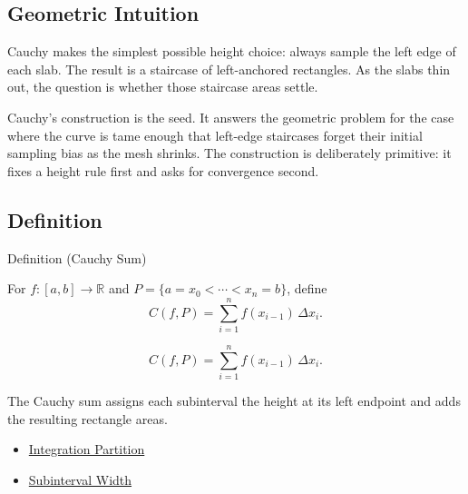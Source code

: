 \subsection*{Geometric Intuition}

\begin{exposition}
Cauchy makes the simplest possible height choice: always sample the left edge
of each slab. The result is a staircase of left-anchored rectangles. As the
slabs thin out, the question is whether those staircase areas settle.
\end{exposition}

\begin{remark*}[Interpretation]
Cauchy's construction is the seed. It answers the geometric problem for the
case where the curve is tame enough that left-edge staircases forget their
initial sampling bias as the mesh shrinks. The construction is deliberately
primitive: it fixes a height rule first and asks for convergence second.
\end{remark*}

\subsection*{Definition}

\begin{definitionbox}{Definition (Cauchy Sum)}
\begin{definition}
\label{def:cauchy-sum}
For \(f:[a,b]\to\mathbb R\) and \(P=\{a=x_0<\cdots<x_n=b\}\), define
\[
  C(f,P)=\sum_{i=1}^{n} f(x_{i-1})\,\Delta x_i.
\]
\end{definition}
\end{definitionbox}

\begin{remark*}
\[
C(f,P)=\sum_{i=1}^{n} f(x_{i-1})\,\Delta x_i.
\]
\end{remark*}

\begin{remark*}[Interpretation]
The Cauchy sum assigns each subinterval the height at its left endpoint and
adds the resulting rectangle areas.
\end{remark*}

\begin{dependencies}
\begin{itemize}
  \item \hyperref[def:integration-partition]{Integration Partition}
  \item \hyperref[def:subinterval-width-integration]{Subinterval Width}
\end{itemize}
\end{dependencies}

